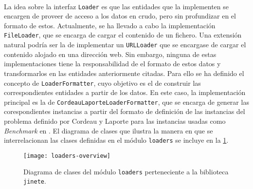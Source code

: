 \documentclass{subfiles}
\begin{document}
          \paragraph{}
          La idea sobre la interfaz \texttt{Loader} es que las entidades que la implementen se encargen de proveer de acceso a los datos en crudo, pero sin profundizar en el formato de estos. Actualmente, se ha llevado a cabo la implementación \texttt{FileLoader}, que se encarga de cargar el contenido de un fichero. Una extensión natural podría ser la de implementar un \texttt{URLLoader} que se encargase de cargar el contenido alojado en una dirección web. Sin embargo, ninguna de estas implementaciones tiene la responsabilidad de  el formato de estos datos y transformarlos en las entidades anteriormente citadas. Para ello se ha definido el concepto de \texttt{LoaderFormatter}, cuyo objetivo es el de construir las correspondientes entidades a partir de los datos. En este caso, la implementación principal es la de \texttt{CordeauLaporteLoaderFormatter}, que se encarga de generar las corespondientes instancias a partir del formato de definición de las instancias del problema definido por Cordeau y Laporte para las instancias usadas como \emph{Benchmark} en \cite{cordeau2003tabu}. El diagrama de clases que ilustra la manera en que se interrelacionan las clases definidas en el módulo \texttt{loaders} se incluye en la \cref{img:loaders_overview}.

          \begin{figure}[ht]
            \centering
            \texttt{[image: loaders-overview]}
            \caption{Diagrama de clases del módulo \texttt{loaders} perteneciente a la biblioteca \texttt{jinete}.}
            \label{img:loaders_overview}
          \end{figure}
\end{document}
